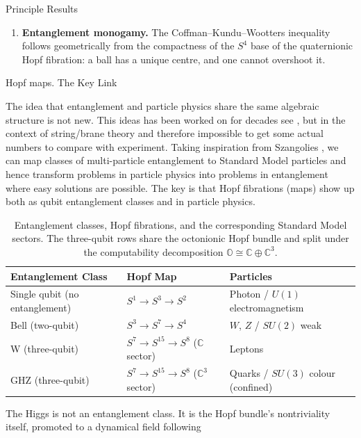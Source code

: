 \documentclass[final]{beamer}
\newlength{\colwidth}
\begin{document}
\begin{frame}[t]
\begin{columns}[t]
\begin{column}{\colwidth}
\begin{block}{Principle Results}
\begin{enumerate}
  \item \textbf{Entanglement monogamy.} The Coffman--Kundu--Wootters inequality follows geometrically from the compactness of the $S^4$ base of the quaternionic Hopf fibration: a ball has a unique centre, and one cannot overshoot it.
\end{enumerate}
  \end{block}
 \begin{block}{Hopf maps. The Key Link}

The idea that entanglement and particle physics share the same algebraic structure is not new. This ideas has been worked on for decades see \autocite{borsten_2009}, but in the context of string/brane theory and therefore impossible to get some actual numbers to compare with experiment. Taking inspiration from Szangolies \autocite{szangolies_2025}, we can map classes of multi-particle entanglement to Standard Model particles and hence transform problems in particle physics into problems in entanglement where easy solutions are possible. The key is that Hopf fibrations (maps) show up both as qubit entanglement classes and in particle physics. 
  \begin{table}[h]
  \centering
  \begin{tabular}{@{}lll@{}}
    \toprule
    \textbf{Entanglement Class} & \textbf{Hopf Map} & \textbf{Particles} \\
    \midrule
    Single qubit (no entanglement) & $S^{1} \to S^{3} \to S^{2}$ & Photon / $U(1)$ electromagnetism \\
    Bell (two-qubit)               & $S^{3} \to S^{7} \to S^{4}$ & $W$, $Z$ / $SU(2)$ weak \\
    W (three-qubit)                & $S^{7} \to S^{15} \to S^{8}$ ($\mathbb{C}$ sector)   & Leptons \\
    GHZ (three-qubit)              & $S^{7} \to S^{15} \to S^{8}$ ($\mathbb{C}^{3}$ sector) & Quarks / $SU(3)$ colour (confined) \\
    \bottomrule
  \end{tabular}
  \caption{Entanglement classes, Hopf fibrations, and the corresponding Standard Model sectors. The three-qubit rows share the octonionic Hopf bundle and split under the computability decomposition $\mathbb{O} \cong \mathbb{C} \oplus \mathbb{C}^{3}$.}
  \label{tab:entanglement-hopf-particles} 
\end{table}
The Higgs is not an entanglement class. It is the Hopf bundle's nontriviality itself, promoted to a dynamical field following \autocite{szangolies_2025, finkelstein_1962, finkelstein_1963}
\end{block}
\end{column}


\end{columns}
\end{frame}
\end{document}
